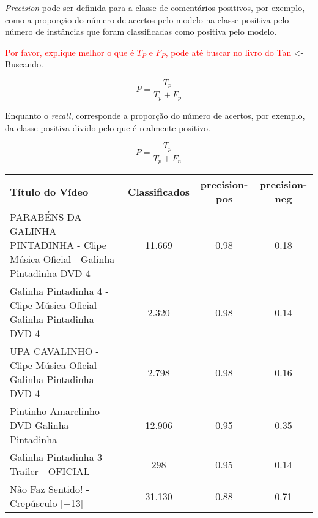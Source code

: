 \textit{Precision} pode ser definida para a classe de comentários positivos, por exemplo, como a proporção do número de acertos pelo modelo na classe positiva pelo número de instâncias que foram classificadas como positiva pelo modelo. 

\textcolor{red}{Por favor, explique melhor o que é $T_P$ e $F_P$, pode até buscar no livro do Tan} <- Buscando.

\begin{equation}
\label{eq:precision-descr}
 {P} = \frac{{T_p}}{{T_p}+{F_p}}
\end{equation}


Enquanto o \textit{recall}, corresponde a proporção do número de acertos, por exemplo, da classe positiva divido pelo que é realmente positivo.

\begin{equation}
\label{eq:recall-descr}
 {P} = \frac{{T_p}}{{T_p}+{F_n}}
\end{equation}

\begin{table}[H]
	
\begin{tabular}{|p{5.5cm}|c|c|c|}
\hline
\textbf{Título do Vídeo} & \textbf{Classificados} & \textbf{precision-pos} & \textbf{precision-neg} \\ \hline
PARABÉNS DA GALINHA PINTADINHA - Clipe Música Oficial - Galinha Pintadinha DVD 4 & 11.669 & 0.98 & 0.18 \\ \hline
Galinha Pintadinha 4 - Clipe Música Oficial - Galinha Pintadinha DVD 4 & 2.320 & 0.98 & 0.14 \\ \hline
UPA CAVALINHO - Clipe Música Oficial - Galinha Pintadinha DVD 4 & 2.798 & 0.98 & 0.16 \\ \hline
Pintinho Amarelinho - DVD Galinha Pintadinha & 12.906 & 0.95 & 0.35 \\ \hline
Galinha Pintadinha 3 - Trailer - OFICIAL & 298 & 0.95 & 0.14 \\ \hline
Não Faz Sentido! - Crepúsculo [+13] & 31.130 & 0.88 & 0.71\\ \hline
\end{tabular}

\end{table}

